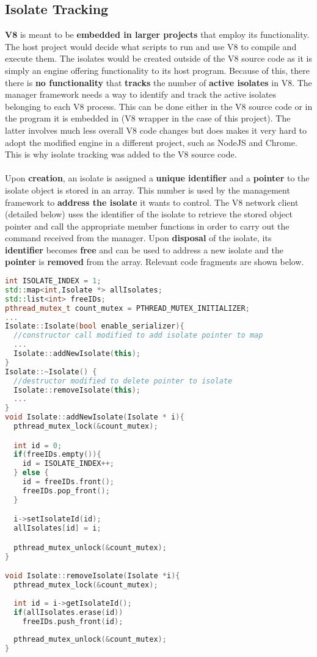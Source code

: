 \documentclass{l4proj}
\begin{document}
\subsection{Isolate Tracking}
\hspace*{1em} \textbf{V8} is meant to be \textbf{embedded in larger projects} that employ its functionality. The host project would decide what scripts to run and use V8 to compile and execute them. The isolates would be created outside of the V8 source code as it is simply an engine offering functionality to its host program. Because of this, there there is \textbf{no functionality} that \textbf{tracks} the number of \textbf{active isolates} in V8. The manager framework needs a way to identify and track the active isolates belonging to each V8 process. This can be done either in the V8 source code or in the program it is embedded in (V8 wrapper in the case of this project). The latter involves much less overall V8 code changes but does makes it very hard to adopt the modified engine in a different project, such as NodeJS and Chrome. This is why isolate tracking was added to the V8 source code.
\\\\
\hspace*{1em} Upon \textbf{creation}, an isolate is assigned a \textbf{unique identifier} and a \textbf{pointer} to the isolate object is stored in an array. This number is used by the management framework to \textbf{address the isolate} it wants to control. The V8 network client (detailed below) uses the identifier of the isolate to retrieve the stored object pointer and call the appropriate member functions in order to carry out the command received from the manager. Upon \textbf{disposal} of the isolate, its \textbf{identifier} becomes \textbf{free} and can be used to address a new isolate and the \textbf{pointer} is \textbf{removed} from the array. Relevant code fragments are shown below.
\begin{lstlisting}[language=cpp]
int ISOLATE_INDEX = 1;
std::map<int,Isolate *> allIsolates;
std::list<int> freeIDs;
pthread_mutex_t count_mutex = PTHREAD_MUTEX_INITIALIZER;
...
Isolate::Isolate(bool enable_serializer){ 
  //constructor call modified to add isolate pointer to map
  ...
  Isolate::addNewIsolate(this);
}
Isolate::~Isolate() {
  //destructor modified to delete pointer to isolate
  Isolate::removeIsolate(this);
  ...
}
void Isolate::addNewIsolate(Isolate * i){
  pthread_mutex_lock(&count_mutex);

  int id = 0;  
  if(freeIDs.empty()){
    id = ISOLATE_INDEX++;
  } else {
    id = freeIDs.front();
    freeIDs.pop_front();
  }

  i->setIsolateId(id);
  allIsolates[id] = i;

  pthread_mutex_unlock(&count_mutex);
}

void Isolate::removeIsolate(Isolate *i){
  pthread_mutex_lock(&count_mutex);
  
  int id = i->getIsolateId();
  if(allIsolates.erase(id))
    freeIDs.push_front(id);
  
  pthread_mutex_unlock(&count_mutex);
}
\end{lstlisting}
\end{document}
